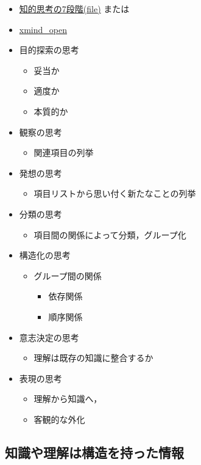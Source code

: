 \documentclass[dvipdfmx,11pat]{jarticle}
\begin{document}
\begin{itemize}
\item \href{../Maps/知的思考の7段階.xmind}{知的思考の7段階(file)} または
\item \href{shell:open ../Maps/知的思考の7段階.xmind}{xmind\_open}

\item 目的探索の思考
\begin{itemize}
\item 妥当か
\item 適度か
\item 本質的か
\end{itemize}
\item 観察の思考
\begin{itemize}
\item 関連項目の列挙
\end{itemize}
\item 発想の思考
\begin{itemize}
\item 項目リストから思い付く新たなことの列挙
\end{itemize}
\item 分類の思考
\begin{itemize}
\item 項目間の関係によって分類，グループ化
\end{itemize}
\item 構造化の思考
\begin{itemize}
\item グループ間の関係
\begin{itemize}
\item 依存関係
\item 順序関係
\end{itemize}
\end{itemize}
\item 意志決定の思考
\begin{itemize}
\item 理解は既存の知識に整合するか
\end{itemize}
\item 表現の思考
\begin{itemize}
\item 理解から知識へ，
\item 客観的な外化
\end{itemize}
\end{itemize}
\subsection{知識や理解は構造を持った情報}
\label{sec:orgc5ba946}
\end{document}
